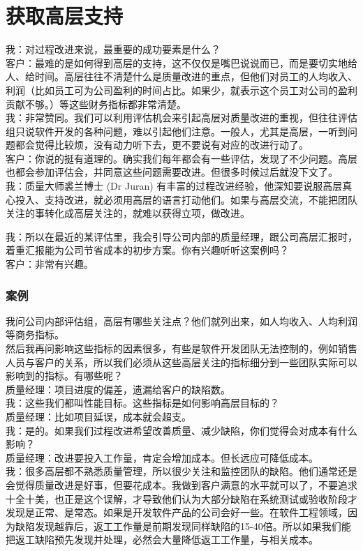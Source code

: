 \chapter{获取高层支持} %


我：对过程改进来说，最重要的成功要素是什么？\\
客户：最难的是如何得到高层的支持，这不仅仅是嘴巴说说而已，而是要切实地给人、给时间。高层往往不清楚什么是质量改进的重点，但他们对员工的人均收入、利润（比如员工可为公司盈利的时间占比。如果少，就表示这个员工对公司的盈利贡献不够。）等这些财务指标都非常清楚。\\
我：非常赞同。我们可以利用评估机会来引起高层对质量改进的重视，但往往评估组只说软件开发的各种问题，难以引起他们注意。一般人，尤其是高层，一听到问题都会觉得比较烦，没有动力听下去，更不要说有对应的改进行动了。\\
客户：你说的挺有道理的。确实我们每年都会有一些评估，发现了不少问题。高层也都会参加评估会，并同意这些问题需要改进。但很多时候过后就没下文了。\\
我：质量大师裘兰博士 (Dr Juran)
有丰富的过程改进经验，他深知要说服高层真心投入、支持改进，就必须用高层的语言打动他们。如果与高层交流，不能把团队关注的事转化成高层关注的，就难以获得立项，做改进。

我：所以在最近的某评估里，我会引导公司内部的质量经理，跟公司高层汇报时，着重汇报能为公司节省成本的初步方案。你有兴趣听听这案例吗？\\
客户：非常有兴趣。\\

\hypertarget{ux7b2cux4e00ux7248ux65b9ux6848ux4e66}{%
\subsection{案例}\label{ux7b2cux4e00ux7248ux65b9ux6848ux4e66}}

我问公司内部评估组，高层有哪些关注点？他们就列出来，如人均收入、人均利润等商务指标。\\
然后我再问影响这些指标的因素很多，有些是软件开发团队无法控制的，例如销售人员与客户的关系，所以我们必须从这些高层关注的指标细分到一些团队实际可以影响到的指标。有哪些呢？\\
质量经理：项目进度的偏差，遗漏给客户的缺陷数。\\
我：这些我们都叫性能目标。这些指标是如何影响高层目标的？\\
质量经理：比如项目延误，成本就会超支。\\
我：是的。如果我们过程改进希望改善质量、减少缺陷，你们觉得会对成本有什么影响？\\
质量经理：改进要投入工作量，肯定会增加成本。但长远应可降低成本。\\
我：很多高层都不熟悉质量管理，所以很少关注和监控团队的缺陷。他们通常还是会觉得质量改进是好事，但要花成本。我做到客户满意的水平就可以了，不要追求十全十美，也正是这个误解，才导致他们认为大部分缺陷在系统测试或验收阶段才发现是正常、是常态。如果是开发软件产品的公司会好一些。在软件工程领域，因为缺陷发现越靠后，返工工作量是前期发现同样缺陷的15-40倍。所以如果我们能把返工缺陷预先发现并处理，必然会大量降低返工工作量，与相关成本。\\


